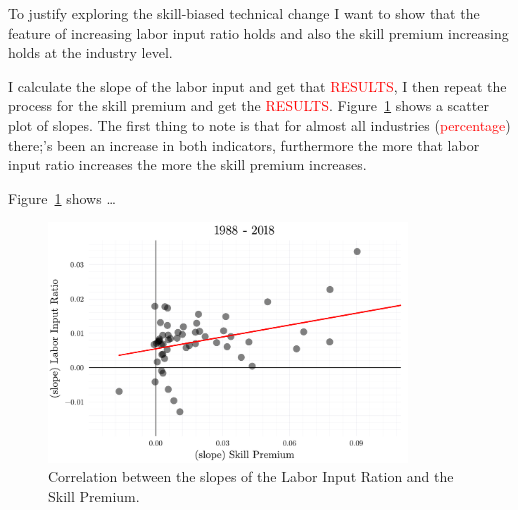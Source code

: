 \documentclass[12pt]{article}
\begin{document}
To justify exploring the skill-biased technical change I want to show that the feature of increasing labor input ratio holds and also the skill premium increasing holds at the industry level.

I calculate the slope of the labor input and get that \textcolor{red}{RESULTS}, I then repeat the process for the skill premium and get the \textcolor{red}{RESULTS}. Figure~\ref*{fig:trends_correlation} shows a scatter plot of slopes. The first thing to note is that for almost all industries (\textcolor{red}{percentage}) there;'s been an increase in both indicators, furthermore the more that labor input ratio increases the more the skill premium increases. 

Figure~\ref{fig:trends_correlation} shows \ldots

\begin{figure}[H]
 \centering
 \includegraphics[width=0.85\textwidth]{../images/trend_correlation_doc.pdf}
 \caption{\label{fig:trends_correlation} Correlation between the slopes of the Labor Input Ration and the Skill Premium.}
\end{figure}
\end{document}
